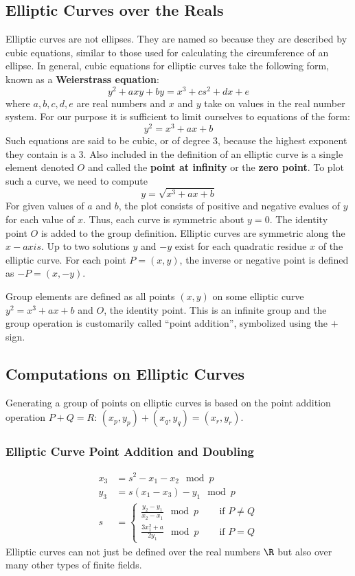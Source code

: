 \documentclass{math}
\begin{document}
\subsection*{Elliptic Curves over the Reals}
Elliptic curves are not ellipses. They are named so because they are described
by cubic equations, similar to those used for calculating the circumference of
an ellipse. In general, cubic equations for elliptic curves take the following
form, known as a \textbf{Weierstrass equation}:
\[ y^2+axy+by = x^3+cs^2+dx+e \]
where \( a,b,c,d,e \) are real numbers and \( x \) and \( y \) take on values
in the real number system. For our purpose it is sufficient to limit ourselves
to equations of the form:
\[ y^2 = x^3+ax+b \]
Such equations are said to be cubic, or of degree 3, because the highest
exponent they contain is a 3. Also included in the definition of an elliptic
curve is a single element denoted \( O \) and called the \textbf{point at
infinity} or the \textbf{zero point}. To plot such a curve, we need to compute
\[ y = \sqrt{x^3+ax+b} \]
For given values of \( a \) and \( b \), the plot consists of positive and
negative evalues of \( y \) for each value of \( x \). Thus, each curve is
symmetric about \( y = 0 \). The identity point \( O \) is added to the group
definition. Elliptic curves are symmetric along the \( x-axis \). Up to two
solutions \( y \) and \( -y \) exist for each quadratic residue \( x \) of the
elliptic curve. For each point \( P = (x,y) \), the inverse or negative point
is defined as \( -P = (x,-y) \).
\par Group elements are defined as all points \( (x,y) \) on some elliptic curve
\( y^2 = x^3+ax+b \) and \( O \), the identity point. This is an infinite group
and the group operation is customarily called ``point addition'', symbolized
using the \( + \) sign.

\subsection*{Computations on Elliptic Curves}
Generating a group of points on elliptic curves is based on the point addition
operation \( P+Q = R \): \( (x_p,y_p)+(x_q,y_q) = (x_r,y_r) \).

\subsubsection*{Elliptic Curve Point Addition and Doubling}
\begin{align*}
  x_3 &= s^2-x_1-x_2\mod p \\
  y_3 &= s(x_1-x_3)-y_1\mod p \\
  s &= \begin{cases}
    \frac{y_2-y_1}{x_2-x_1}\mod p &\quad \text{ if } P\ne Q \\
    \frac{3x_1^2+a}{2y_1}\mod p &\quad \text{ if } P=Q
  \end{cases}
\end{align*}
Elliptic curves can not just be defined over the real numbers \( \R \) but also
over many other types of finite fields.
\end{document}
